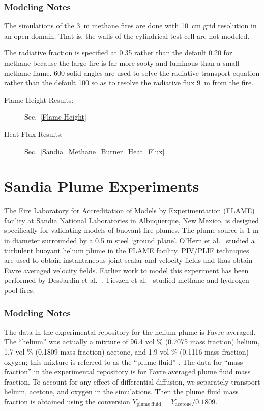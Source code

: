 \subsubsection{Modeling Notes}

The simulations of the 3~m methane fires are done with 10~cm grid resolution in an open domain. That is, the walls of the cylindrical test cell are not modeled. 

The radiative fraction is specified at 0.35 rather than the default 0.20 for methane because the large fire is far more sooty and luminous than a small methane flame. 600 solid angles are used to solve the radiative transport equation rather than the default 100 so as to resolve the radiative flux 9~m from the fire. 

\begin{description}
\item[Flame Height Results:] Sec.~\ref{Flame Height} 
\item[Heat Flux Results:] Sec.~\ref{Sandia_Methane_Burner_Heat_Flux} 
\end{description}

\FloatBarrier

\section{Sandia Plume Experiments}
\label{Sandia_Plume_Description}

The Fire Laboratory for Accreditation of Models by Experimentation (FLAME) facility \cite{OHern:2005,Blanchat:2001} at Sandia National Laboratories in Albuquerque, New Mexico, is designed specifically for validating models of buoyant fire plumes.  The plume source is 1 m in diameter surrounded by a 0.5 m steel `ground plane'.  O'Hern et al.~\cite{OHern:2005} studied a turbulent buoyant helium plume in the FLAME facility. PIV/PLIF techniques are used to obtain instantaneous joint scalar and velocity fields and thus obtain Favre averaged velocity fields. Earlier work to model this experiment has been performed by DesJardin et al.~\cite{DesJardin:2004}. Tieszen et al.~\cite{Tieszen:2004,Tieszen:2002} studied methane and hydrogen pool fires.

\subsubsection{Modeling Notes}

The data in the experimental repository for the helium plume is Favre averaged.  The ``helium'' was actually a mixture of 96.4 vol \% (0.7075 mass fraction) helium, 1.7 vol \% (0.1809 mass fraction) acetone, and 1.9 vol \% (0.1116 mass fraction) oxygen; this mixture is referred to as the ``plume fluid'' \cite{OHern:2005}.  The data for ``mass fraction'' in the experimental repository is for Favre averaged plume fluid mass fraction.  To account for any effect of differential diffusion, we separately transport helium, acetone, and oxygen in the simulations.  Then the plume fluid mass fraction is obtained using the conversion $Y_{\mathrm{plume\;fluid}} = Y_{\mathrm{acetone}}/0.1809$.

